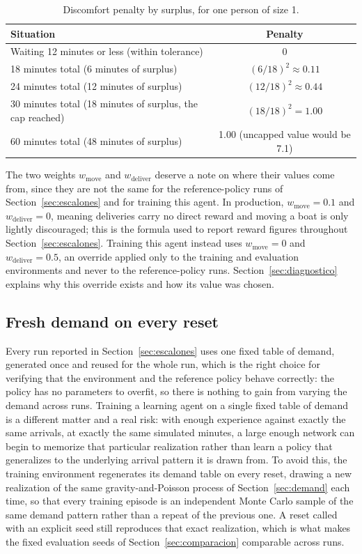 \documentclass[11pt,a4paper]{article}
\begin{document}
\begin{table}[H]
\centering
\caption{Discomfort penalty by surplus, for one person of size 1.}
\label{tab:reward-magnitudes}
\small
\begin{tabular}{lc}
\toprule
Situation & Penalty \\
\midrule
Waiting 12 minutes or less (within tolerance) & 0 \\
18 minutes total (6 minutes of surplus) & $(6/18)^2 \approx 0.11$ \\
24 minutes total (12 minutes of surplus) & $(12/18)^2 \approx 0.44$ \\
30 minutes total (18 minutes of surplus, the cap reached) & $(18/18)^2 = 1.00$ \\
60 minutes total (48 minutes of surplus) & 1.00 (uncapped value would be 7.1) \\
\bottomrule
\end{tabular}
\end{table}

The two weights $w_{\text{move}}$ and $w_{\text{deliver}}$ deserve a note on where their values come from, since they are not the same for the reference-policy runs of Section~\ref{sec:escalones} and for training this agent. In production, $w_{\text{move}} = 0.1$ and $w_{\text{deliver}} = 0$, meaning deliveries carry no direct reward and moving a boat is only lightly discouraged; this is the formula used to report reward figures throughout Section~\ref{sec:escalones}. Training this agent instead uses $w_{\text{move}} = 0$ and $w_{\text{deliver}} = 0.5$, an override applied only to the training and evaluation environments and never to the reference-policy runs. Section~\ref{sec:diagnostico} explains why this override exists and how its value was chosen.

\subsection{Fresh demand on every reset}
\label{sec:demanda-fresca}

Every run reported in Section~\ref{sec:escalones} uses one fixed table of demand, generated once and reused for the whole run, which is the right choice for verifying that the environment and the reference policy behave correctly: the policy has no parameters to overfit, so there is nothing to gain from varying the demand across runs. Training a learning agent on a single fixed table of demand is a different matter and a real risk: with enough experience against exactly the same arrivals, at exactly the same simulated minutes, a large enough network can begin to memorize that particular realization rather than learn a policy that generalizes to the underlying arrival pattern it is drawn from. To avoid this, the training environment regenerates its demand table on every reset, drawing a new realization of the same gravity-and-Poisson process of Section~\ref{sec:demand} each time, so that every training episode is an independent Monte Carlo sample of the same demand pattern rather than a repeat of the previous one. A reset called with an explicit seed still reproduces that exact realization, which is what makes the fixed evaluation seeds of Section~\ref{sec:comparacion} comparable across runs.
\end{document}
